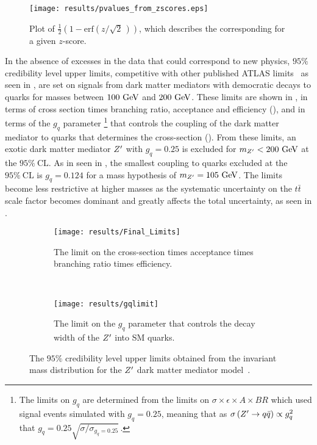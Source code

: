 \begin{figure}[htbp]
 \centering
 \texttt{[image: results/pvalues\_from\_zscores.eps]}
 \caption[Plot of \pvalue{} as a function of $z$-score.]{%
  Plot of $\frac{1}{2}\left(1 - \mathrm{erf}\left(z/\sqrt{2}\,\right)\right)$, which describes the corresponding \pvalue{} for a given $z$-score.}\label{fig:pvalues_from_zscores}
\end{figure}

In the absence of excesses in the data that could correspond to new physics, $95\%$ credibility level upper limits, competitive with other published ATLAS limits~\cite{EXOT-2017-32} as seen in , are set on signals from dark matter mediators with democratic decays to quarks for masses between $100~\mathrm{GeV}$ and $200~\mathrm{GeV}$.
These limits are shown in , in terms of cross section times branching ratio, acceptance and efficiency (), and in terms of the $g_{q}$ parameter%
\footnote{The limits on $g_{q}$ are determined from the limits on $\sigma \times \epsilon \times A \times BR$ which used signal events simulated with $g_{q} = 0.25$, meaning that as $\sigma\left(Z^{\prime} \to q\bar{q}\right) \propto g_{q}^{2}$ that $g_{q} = 0.25 \sqrt{\sigma/\sigma_{g_{q} = 0.25}}$\,.}
that controls the coupling of the \gls{dark matter mediator} to quarks that determines the cross-section ().
From these limits, an exotic dark matter mediator $\Zprime$ with $g_{q}=0.25$ is excluded for $m_{Z^{\prime}} < 200~\mathrm{GeV}$ at the $95\%~\mathrm{CL}$.
As in seen in , the smallest coupling to quarks excluded at the $95\%~\mathrm{CL}$ is $g_{q} = 0.124$ for a mass hypothesis of $m_{Z^{\prime}} = 105~\mathrm{GeV}$.
The limits become less restrictive at higher masses as the systematic uncertainty on the $t\bar{t}$ scale factor becomes dominant and greatly affects the total uncertainty, as seen in .

\begin{figure}[htbp]
 \centering
 \begin{subfigure}[t]{0.5\textwidth}
  \centering
  \texttt{[image: results/Final\_Limits]}
  \caption{The limit on the cross-section times acceptance times branching ratio times efficiency.}
  \label{fig:cross_section_limits}
 \end{subfigure}%
 ~
 \begin{subfigure}[t]{0.5\textwidth}
  \centering
  \texttt{[image: results/gqlimit]}
  \caption{The limit on the $g_{q}$ parameter that controls the decay width of the $\Zprime$ into SM quarks.}
  \label{fig:gq_limits}
 \end{subfigure}
 \caption[The $95\%$ credibility level upper limits obtained from the invariant mass distribution for the $\Zprime$ dark matter mediator model.]{%
  The $95\%$ credibility level upper limits obtained from the invariant mass distribution for the $\Zprime$ dark matter mediator model~\cite{ATLAS-CONF-2018-052}.}
 \label{fig:Zprime_limits}
\end{figure}

